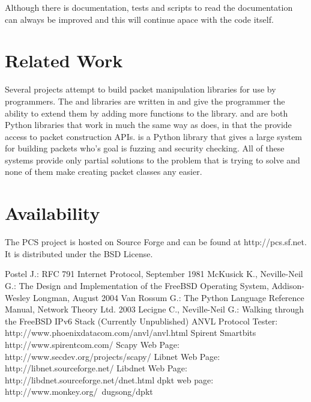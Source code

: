 \documentclass[11pt]{article}
\begin{document}
Although there is documentation, tests and scripts to read the
documentation can always be improved and this will continue apace with
the code itself.

\section{Related Work}
\label{sec:related-work}

Several projects attempt to build packet manipulation libraries for
use by programmers.  The  \cite{libnet} and
 libraries are written in  and give the
programmer the ability to extend them by adding more 
functions to the library.   \cite{dpkt} and
 \cite{libdnet} are both Python libraries that work in much
the same way as  does, in that the provide access to
packet construction APIs.   \cite{scapy} is a Python
library that gives a large system for building packets who's goal is
fuzzing and security checking.  All of these systems provide only
partial solutions to the problem that  is trying to solve
and none of them make creating packet classes any easier.

\section{Availability}
\label{sec:availability}

The PCS project is hosted on Source Forge and can be found at
http://pcs.sf.net.  It is distributed under the BSD License.

\begin{thebibliography}{99} 
 Postel J.: RFC 791 Internet Protocol, September 1981
 McKusick K., Neville-Neil G.: The Design and
  Implementation of the FreeBSD Operating System, Addison-Wesley
  Longman, August 2004
 Van Rossum G.: The Python Language Reference Manual,
  Network Theory Ltd. 2003
 Lecigne C., Neville-Neil G.: Walking through the
  FreeBSD IPv6 Stack (Currently Unpublished)
 ANVL Protocol Tester:
  http://www.phoenixdatacom.com/anvl/anvl.html
Spirent Smartbits http://www.spirentcom.com/
 Scapy Web Page: http://www.secdev.org/projects/scapy/
 Libnet Web Page: http://libnet.sourceforge.net/
 Libdnet Web Page: http://libdnet.sourceforge.net/dnet.html
 dpkt web page: http://www.monkey.org/~dugsong/dpkt
\end{thebibliography}
\end{document}
